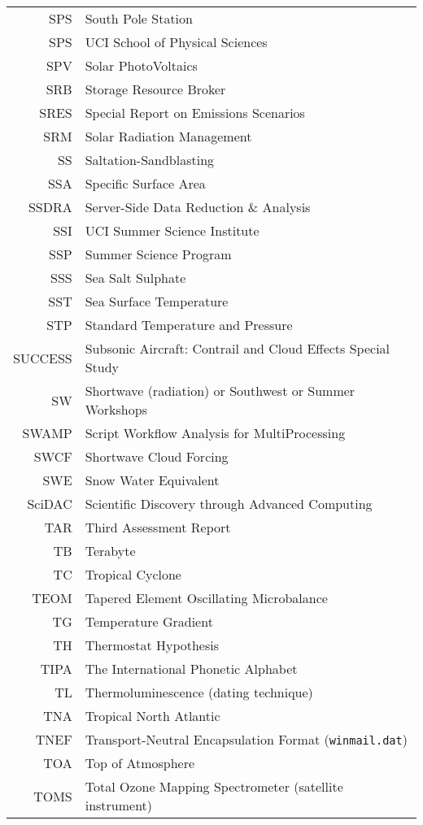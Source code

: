 \documentclass[12pt,twoside]{article}
\begin{document}
\begin{longtable}[>{\bfseries}l]{>{\ttfamily}r l}
SPS & South Pole Station \\
SPS & UCI School of Physical Sciences \\
SPV & Solar PhotoVoltaics \\
SRB & Storage Resource Broker \\ %
SRES & Special Report on Emissions Scenarios \\
SRM & Solar Radiation Management \\
SS & Saltation-Sandblasting \\
SSA & Specific Surface Area \\
SSDRA & Server-Side Data Reduction \& Analysis \\
SSI & UCI Summer Science Institute \\
SSP & Summer Science Program \\
SSS & Sea Salt Sulphate \\
SST & Sea Surface Temperature \\
STP & Standard Temperature and Pressure \\
SUCCESS & Subsonic Aircraft: Contrail and Cloud Effects Special Study \\
SW & Shortwave (radiation) or Southwest or Summer Workshops \\
SWAMP & Script Workflow Analysis for MultiProcessing \\
SWCF & Shortwave Cloud Forcing \\
SWE & Snow Water Equivalent \\
SciDAC & Scientific Discovery through Advanced Computing \\
TAR & Third Assessment Report \\
TB & Terabyte \\
TC & Tropical Cyclone \\
TEOM & Tapered Element Oscillating Microbalance \\
TG & Temperature Gradient \\
TH & Thermostat Hypothesis \\
TIPA & The International Phonetic Alphabet \\
TL & Thermoluminescence (dating technique) \\
TNA & Tropical North Atlantic \\
TNEF & Transport-Neutral Encapsulation Format (\texttt{winmail.dat}) \\
TOA & Top of Atmosphere \\
TOMS & Total Ozone Mapping Spectrometer (satellite instrument) \\

\end{longtable}
\end{document}
